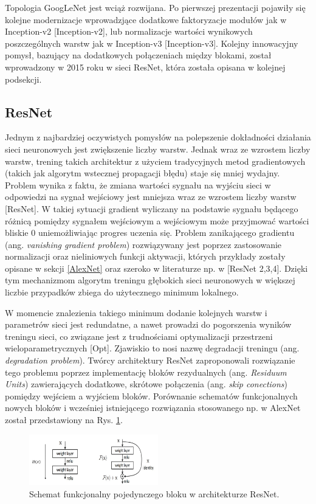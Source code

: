 Topologia GoogLeNet jest wciąż rozwijana. Po pierwszej prezentacji pojawiły się kolejne modernizacje wprowadzjące dodatkowe faktoryzacje modułów jak w Inception-v2 [Inception-v2], lub normalizacje wartości wynikowych poszczególnych warstw jak w Inception-v3 [Inception-v3]. Kolejny innowacyjny pomysł, bazujący na dodatkowych połączeniach między blokami, został wprowadzony w 2015 roku w sieci ResNet, która została opisana w kolejnej podsekcji.

\subsection{ResNet}

Jednym z najbardziej oczywistych pomysłów na polepszenie dokładności działania sieci neuronowych jest zwiększenie liczby warstw. Jednak wraz ze wzrostem liczby warstw, trening takich architektur z użyciem tradycyjnych metod gradientowych (takich jak algorytm wstecznej propagacji błędu) staje się mniej wydajny. Problem wynika z faktu, że zmiana wartości sygnału na wyjściu sieci w odpowiedzi na sygnał wejściowy jest mniejsza wraz ze wzrostem liczby warstw [ResNet]. W takiej sytuacji gradient wyliczany na podstawie sygnału będącego różnicą pomiędzy sygnałem wejściowym a wejściowym może przyjmować wartości bliskie 0 uniemożliwiając progres uczenia się. Problem zanikającego gradientu (ang. \textit{vanishing gradient problem}) rozwiązywany jest poprzez zastosowanie normalizacji oraz nieliniowych funkcji aktywacji, których przykłady zostały opisane w sekcji \ref{AlexNet} oraz szeroko w literaturze np. w [ResNet 2,3,4]. Dzięki tym mechanizmom algorytm treningu głębokich sieci neuronowych w większej liczbie przypadków zbiega do użytecznego minimum lokalnego. 

W momencie znalezienia takiego minimum dodanie kolejnych warstw i parametrów sieci jest redundatne, a nawet prowadzi do pogorszenia wyników treningu sieci, co związane jest z trudnościami optymalizacji przestrzeni wieloparametrycznych [Opt]. Zjawiskio to nosi nazwę degradacji treningu (ang. \textit{degradation problem}). Twórcy architektury ResNet zaproponowali rozwiązanie tego problemu poprzez implementację bloków rezydualnych (ang. \textit{Residuum Units}) zawierających dodatkowe, skrótowe połączenia (ang. \textit{skip conections}) pomiędzy wejściem a wyjściem bloków. Porównanie schematów funkcjonalnych nowych bloków i wcześniej istniejącego rozwiązania stosowanego np. w AlexNet został przedstawiony na Rys. \ref{ResNetBlock}.
\begin{figure}[h!]
	\centering
	\includegraphics[width=0.5\textwidth]{figures/ResidualBlock.jpg}
	\caption{Schemat funkcjonalny pojedynczego bloku w architekturze ResNet.}
	\label{ResNetBlock}
\end{figure} 

